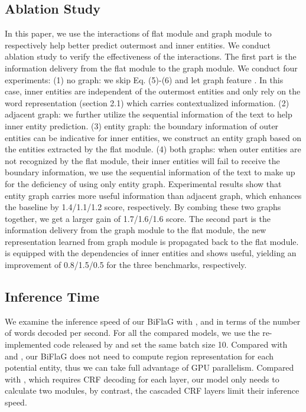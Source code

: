 \documentclass[11pt,a4paper]{article}
\begin{document}
\subsection{Ablation Study}
In this paper, we use the interactions of flat module and graph module to respectively help better predict outermost and inner entities. We conduct ablation study to verify the effectiveness of the interactions.
The first part is the information delivery from the flat  module to the graph module.
We conduct four experiments: (1) no graph: we skip Eq. (5)-(6) and let graph feature . In this case, inner entities are independent of the outermost entities and only rely on the word representation (section 2.1) which carries contextualized information. (2) adjacent graph: we further utilize the sequential information of the text to help inner entity prediction. (3) entity graph: the boundary information of outer entities can be indicative for inner entities, we construct an entity graph based on the entities extracted by the flat module. (4) both graphs: when outer entities are not recognized by the flat module, their inner entities will fail to receive the boundary information, we use the sequential information of the text to make up for the deficiency of using only entity graph. Experimental results show that entity graph carries more useful information than adjacent graph, which enhances the baseline by 1.4/1.1/1.2  score, respectively.
By combing these two graphs together, we get a larger gain of 1.7/1.6/1.6  score.
The second part is the information delivery from  the graph module  to  the flat module, the new representation  learned from graph module is propagated back to the flat  module.  is equipped with the dependencies of inner entities and shows useful, yielding an improvement of 0.8/1.5/0.5  for the three benchmarks, respectively.


\subsection{Inference Time}

We examine the inference speed of our BiFlaG with \cite{zheng2019boundary}, \cite{sohrab2018deep} and \cite{ju2018neural}  in terms of the number of words decoded per second. 
For all the compared models, we use the re-implemented code released by \cite{zheng2019boundary} and set the same batch size 10.
Compared with \cite{zheng2019boundary} and \cite{sohrab2018deep}, our BiFlaG
does not need to compute region representation for each potential entity, thus we can take full advantage of GPU parallelism.
Compared with \cite{ju2018neural}, which requires CRF decoding for each layer, our model only needs to calculate two modules, by contrast, the cascaded CRF layers limit their inference speed.
\end{document}
